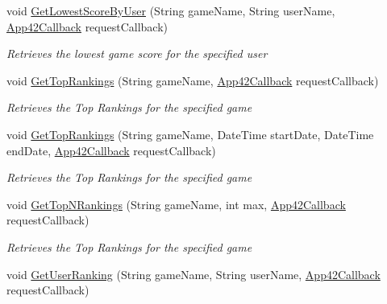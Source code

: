 \begin{DoxyCompactItemize}
void \hyperlink{classcom_1_1shephertz_1_1app42_1_1paas_1_1sdk_1_1windows_1_1game_1_1_score_board_service_adb95c5cf5533277a890d12fb1b79037c}{Get\+Lowest\+Score\+By\+User} (String game\+Name, String user\+Name, \hyperlink{interfacecom_1_1shephertz_1_1app42_1_1paas_1_1sdk_1_1windows_1_1_app42_callback}{App42\+Callback} request\+Callback)
\begin{DoxyCompactList}\small\item\em Retrieves the lowest game score for the specified user \end{DoxyCompactList}\item 
void \hyperlink{classcom_1_1shephertz_1_1app42_1_1paas_1_1sdk_1_1windows_1_1game_1_1_score_board_service_acd8eb460263e39d1a65160b8b33e175c}{Get\+Top\+Rankings} (String game\+Name, \hyperlink{interfacecom_1_1shephertz_1_1app42_1_1paas_1_1sdk_1_1windows_1_1_app42_callback}{App42\+Callback} request\+Callback)
\begin{DoxyCompactList}\small\item\em Retrieves the Top Rankings for the specified game \end{DoxyCompactList}\item 
void \hyperlink{classcom_1_1shephertz_1_1app42_1_1paas_1_1sdk_1_1windows_1_1game_1_1_score_board_service_a01b3b1e2df1773dda69e7f9faa7d5975}{Get\+Top\+Rankings} (String game\+Name, Date\+Time start\+Date, Date\+Time end\+Date, \hyperlink{interfacecom_1_1shephertz_1_1app42_1_1paas_1_1sdk_1_1windows_1_1_app42_callback}{App42\+Callback} request\+Callback)
\begin{DoxyCompactList}\small\item\em Retrieves the Top Rankings for the specified game \end{DoxyCompactList}\item 
void \hyperlink{classcom_1_1shephertz_1_1app42_1_1paas_1_1sdk_1_1windows_1_1game_1_1_score_board_service_ac47591ab6d056c40d88fed946f956799}{Get\+Top\+N\+Rankings} (String game\+Name, int max, \hyperlink{interfacecom_1_1shephertz_1_1app42_1_1paas_1_1sdk_1_1windows_1_1_app42_callback}{App42\+Callback} request\+Callback)
\begin{DoxyCompactList}\small\item\em Retrieves the Top Rankings for the specified game \end{DoxyCompactList}\item 
void \hyperlink{classcom_1_1shephertz_1_1app42_1_1paas_1_1sdk_1_1windows_1_1game_1_1_score_board_service_a1592a56627c79f9fdd30c3070152807c}{Get\+User\+Ranking} (String game\+Name, String user\+Name, \hyperlink{interfacecom_1_1shephertz_1_1app42_1_1paas_1_1sdk_1_1windows_1_1_app42_callback}{App42\+Callback} request\+Callback)

\end{DoxyCompactItemize}
